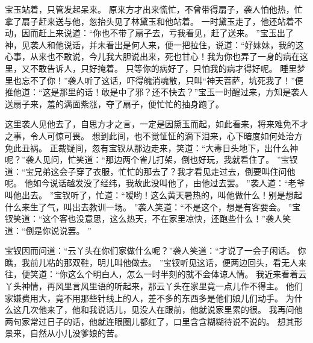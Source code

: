 \par
宝玉站着，只管发起呆来。
原来方才出来慌忙，不曾带得扇子，袭人怕他热，忙拿了扇子赶来送与他，忽抬头见了林黛玉和他站着。
一时黛玉走了，他还站着不动，因而赶上来说道：“你也不带了扇子去，亏我看见，赶了送来。
”宝玉出了神，见袭人和他说话，并未看出是何人来，便一把拉住，说道：“好妹妹，我的这心事，从来也不敢说，今儿我大胆说出来，死也甘心！我为你也弄了一身的病在这里，又不敢告诉人，只好掩着。
只等你的病好了，只怕我的病才得好呢。
睡里梦里也忘不了你！”袭人听了这话，吓得魄消魂散，只叫“神天菩萨，坑死我了！”便推他道：“这是那里的话！敢是中了邪？还不快去？”宝玉一时醒过来，方知是袭人送扇子来，羞的满面紫涨，夺了扇子，便忙忙的抽身跑了。
\par
这里袭人见他去了，自思方才之言，一定是因黛玉而起，如此看来，将来难免不才之事，令人可惊可畏。
想到此间，也不觉怔怔的滴下泪来，心下暗度如何处治方免此丑祸。
正裁疑间，忽有宝钗从那边走来，笑道：“大毒日头地下，出什么神呢？”袭人见问，忙笑道：“那边两个雀儿打架，倒也好玩，我就看住了。
”宝钗道：“宝兄弟这会子穿了衣服，忙忙的那去了？我才看见走过去，倒要叫住问他呢。
他如今说话越发没了经纬，我故此没叫他了，由他过去罢。
”袭人道：“老爷叫他出去。
”宝钗听了，忙道：“嗳哟！这么黄天暑热的，叫他做什么！别是想起什么来生了气，叫出去教训一场。
”袭人笑道：“不是这个，想是有客要会。
”宝钗笑道：“这个客也没意思，这么热天，不在家里凉快，还跑些什么！”袭人笑道：“倒是你说说罢。
”\par
宝钗因而问道：“云丫头在你们家做什么呢？”袭人笑道：“才说了一会子闲话。
你瞧，我前儿粘的那双鞋，明儿叫他做去。
”宝钗听见这话，便两边回头，看无人来往，便笑道：“你这么个明白人，怎么一时半刻的就不会体谅人情。
我近来看着云丫头神情，再风里言风里语的听起来，那云丫头在家里竟一点儿作不得主。
他们家嫌费用大，竟不用那些针线上的人，差不多的东西多是他们娘儿们动手。
为什么这几次他来了，他和我说话儿，见没人在跟前，他就说家里累的很。
我再问他两句家常过日子的话，他就连眼圈儿都红了，口里含含糊糊待说不说的。
想其形景来，自然从小儿没爹娘的苦。
